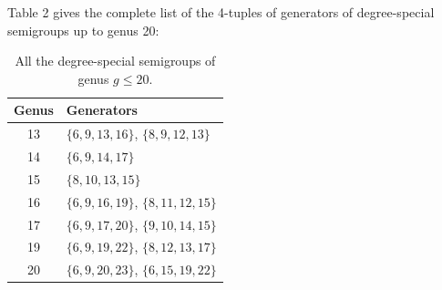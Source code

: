 \documentclass[twoside,12pt, leqno]{amsart}
\theoremstyle{definition}
\begin{document}
Table 2 gives the complete list
of the 4-tuples of generators of degree-special semigroups up to genus 20:
\begin{table}[h]\label{table1}
\centering
\begin{tabular}{cl}
\toprule
Genus & Generators \\
\midrule
13 & $\{6, 9, 13, 16\}$, $\{8, 9, 12, 13\}$ \\
14 & $\{6, 9, 14, 17\}$ \\
15 & $\{8, 10, 13, 15\}$ \\
16 & $\{6, 9, 16, 19\}$, $\{8, 11, 12, 15\}$ \\
17 & $\{6, 9, 17, 20\}$, $\{9, 10, 14, 15\}$ \\
19 & $\{6, 9, 19, 22\}$, $\{8, 12, 13, 17\}$ \\
20 & $\{6, 9, 20, 23\}$, $\{6, 15, 19, 22\}$ \\
\bottomrule
\end{tabular}
\caption{All the degree-special semigroups of genus $g \leq 20$. 
}
\end{table}
\end{document}
